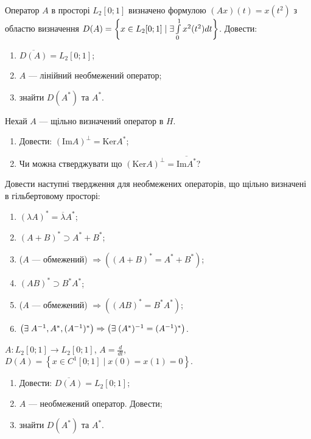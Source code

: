\begin{exercise}
    Оператор $A$ в просторі $L_2[0;1]$ визначено формулою $(Ax)(t) = x(t^2)$ з областю визначення
    $D(A) = \left\{ x \in L_2[0;1] \mid \exists \int\limits_{0}^{1} x^2(t^2) dt \right\}$. Довести:
    \begin{enumerate}
        \item $\overline{D(A)} = L_2[0;1]$;
        \item $A$ --- лінійний необмежений оператор;
        \item знайти $D(A^*)$ та $A^*$.
    \end{enumerate}
\end{exercise}

\begin{exercise}
    Нехай $A$ --- щільно визначений оператор в $H$.
    \begin{enumerate}
        \item Довести: $(\mathrm{Im}A)^\perp = \mathrm{Ker}A^*$;
        \item Чи можна стверджувати що $(\mathrm{Ker}A)^\perp = \overline{\mathrm{Im}A^*}$?
    \end{enumerate}
\end{exercise}

\begin{exercise}
    Довести наступні твердження для необмежених операторів, що щільно визначені в гільбертовому
    просторі:
    \begin{enumerate}
        \item $(\lambda A)^* = \overline{\lambda} A^*$;
        \item $(A + B)^* \supset A^* + B^*$;
        \item ($A$ --- обмежений) $\Rightarrow \left( (A+B)^* = A^* + B^* \right)$;
        \item $(AB)^* \supset B^* A^*$;
        \item ($A$ --- обмежений) $\Rightarrow \left( (AB)^* = B^* A^* \right)$;
        \item $\left( \exists \; A^{-1}, A^*, (A^{-1})^* \right) \Rightarrow
               \left( \exists \; (A^*)^{-1} = (A^{-1})^* \right)$.
    \end{enumerate}
\end{exercise}

\begin{exercise}
    $A : L_2[0;1] \to L_2[0;1]$, $A = \frac{d}{dt}$,
    $D(A) = \left\{
        x \in C^1[0;1] \mid x(0) = x(1) = 0
    \right\}.$
    \begin{enumerate}
        \item Довести: $\overline{D(A)} = L_2[0;1]$;
        \item $A$ --- необмежений оператор. Довести;
        \item знайти $D(A^*)$ та $A^*$. 
    \end{enumerate}
\end{exercise}

